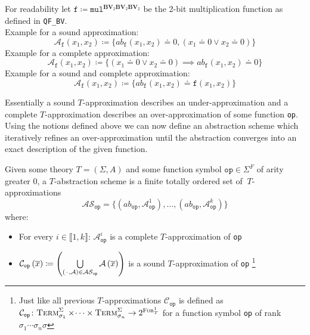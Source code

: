 \begin{example}
For readability let $\texttt{f} \coloneqq \texttt{mul}^{\mathbf{BV}_2\mathbf{BV}_2\mathbf{BV}_2}$ be the 2-bit multiplication function as defined in \texttt{QF\_BV}.\\
Example for a sound approximation:
\[
    \mathcal{A}_\texttt{f}\left(x_1,x_2\right) 
    \coloneqq \{
    ab_\texttt{f}\left(x_1,x_2\right) \doteq 0, \left(x_1\doteq 0 \lor x_2 \doteq 0\right)
    \}
\]
Example for a complete approximation:
\[
    \mathcal{A}_\texttt{f}\left(x_1,x_2\right) 
    \coloneqq \{
    \left(x_1\doteq 0 \lor x_2 \doteq 0\right) \implies ab_\texttt{f}\left(x_1,x_2\right) \doteq 0
    \}
\]
Example for a sound and complete approximation:
\[
\mathcal{A}_\texttt{f}\left(x_1,x_2\right) 
        \coloneqq \{
        ab_\texttt{f}\left(x_1,x_2\right) \doteq \texttt{f}\left(x_1,x_2\right)
        \}
\]
\end{example}
Essentially a sound $T$-approximation describes an under-approximation and a complete $T$-approximation describes an over-approximation of some function \texttt{op}. Using the notions defined above we can now define an abstraction scheme which iteratively refines an over-approximation until the abstraction converges into an exact description of the given function.
\begin{definition}
Given some theory $T=\left(\Sigma,A\right)$ and some function symbol $\texttt{op}\in\Sigma^F$ of arity greater $0$, a $T$-abstraction scheme is a finite totally ordered set of $\ T$-approximations \[
\mathcal{AS}_{\texttt{op}} = \{ \left(ab_{\texttt{op}}, \mathcal{A}^1_{\texttt{op}}\right),\dots,\left(ab_{\texttt{op}}, \mathcal{A}^k_{\texttt{op}}\right) \}
\]
where:
\begin{itemize}
    \item For every $i\in\llbracket1,k\rrbracket$: $\mathcal{A}^i_{\texttt{op}}$ is a complete $T$-approximation of \texttt{op}
    \item $\mathcal{C}_{\texttt{op}}\left(\overline{x}\right)\coloneqq\left(\bigcup\limits_{\left({\mkern 2mu\cdot\mkern 2mu},\mathcal{A}\right)\in\mathcal{AS}_{\texttt{op}}} \mathcal{A}\left(\overline{x}\right)\right)$ is a sound $T$-approximation of \texttt{op}
    \footnote{
        Just like all previous $T$-approximations $\mathcal{C}_{\texttt{op}}$ is defined as
        $\mathcal{C}_{\texttt{op}}\colon \textsc{Term}^\Sigma_{\sigma_1}\times\dotsi\times\textsc{Term}^\Sigma_{\sigma_n} \to 2^{\textsc{For}^1_T}$ for a function symbol \texttt{op} of rank $\sigma_1\dotsi\sigma_n\sigma$
    }
\end{itemize}
\end{definition}

